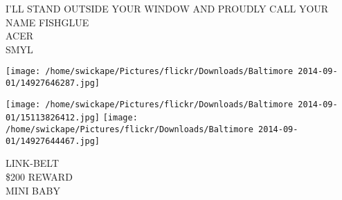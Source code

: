 \documentclass[10pt,letterpaper]{article}
\begin{document}
I'LL STAND OUTSIDE YOUR WINDOW AND PROUDLY CALL YOUR NAME FISHGLUE\\
ACER\\
SMYL\\
\pagebreak

\texttt{[image: /home/swickape/Pictures/flickr/Downloads/Baltimore 2014-09-01/14927646287.jpg]}

\vspace{0.25in}
\texttt{[image: /home/swickape/Pictures/flickr/Downloads/Baltimore 2014-09-01/15113826412.jpg]}
\texttt{[image: /home/swickape/Pictures/flickr/Downloads/Baltimore 2014-09-01/14927644467.jpg]}

LINK{-}BELT\\
\$200 REWARD\\
MINI BABY\\
\pagebreak
\end{document}
